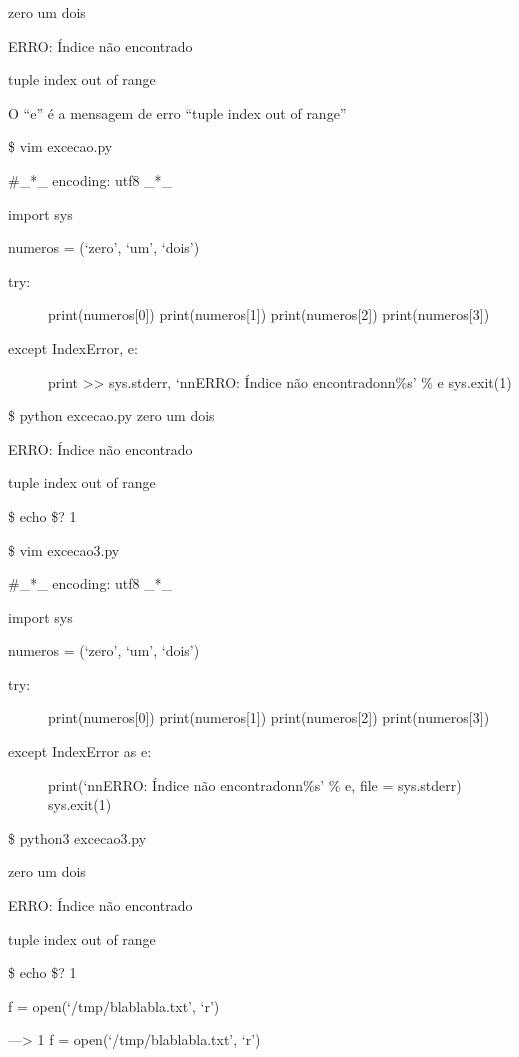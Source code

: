 \documentclass[letterpaper,10pt,brazil]{sphinxmanual}
\begin{document}
zero
um
dois

ERRO: Índice não encontrado

tuple index out of range

O “e” é a mensagem de erro “tuple index out of range”

\$ vim excecao.py

\#\_*\_ encoding: utf\sphinxhyphen{}8 \_*\_

import sys

numeros = (‘zero’, ‘um’, ‘dois’)
\begin{description}
\item[{try:}] \leavevmode
print(numeros{[}0{]})
print(numeros{[}1{]})
print(numeros{[}2{]})
print(numeros{[}3{]})

\item[{except IndexError, e:}] \leavevmode
print \textgreater{}\textgreater{} sys.stderr, ‘nnERRO: Índice não encontradonn\%s’ \% e
sys.exit(1)

\end{description}

\$ python excecao.py
zero
um
dois

ERRO: Índice não encontrado

tuple index out of range

\$ echo \$?
1

\$ vim excecao3.py

\#\_*\_ encoding: utf\sphinxhyphen{}8 \_*\_

import sys

numeros = (‘zero’, ‘um’, ‘dois’)
\begin{description}
\item[{try:}] \leavevmode
print(numeros{[}0{]})
print(numeros{[}1{]})
print(numeros{[}2{]})
print(numeros{[}3{]})

\item[{except IndexError as e:}] \leavevmode
print(‘nnERRO: Índice não encontradonn\%s’ \% e, file = sys.stderr)
sys.exit(1)

\end{description}

\$ python3 excecao3.py

zero
um
dois

ERRO: Índice não encontrado

tuple index out of range

\$ echo \$?
1

f = open(‘/tmp/blablabla.txt’, ‘r’)

—\sphinxhyphen{}\textgreater{} 1 f = open(‘/tmp/blablabla.txt’, ‘r’)
\end{document}
